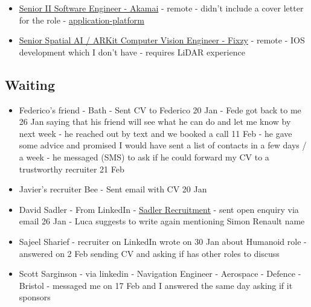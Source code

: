 \begin{itemize}
    \href{https://agratas.com/careers/jobs-opening/53240180-vision-systems-engineer}{Vision
    System Engineer - Agratas} - Bridgewater 
  \item
    \href{https://jobs.akamai.com/en/sites/CX_1/jobs/preview/2294/?keyword=Software&location=United+Kingdom&locationId=300000000469201&locationLevel=country&mode=location}
    {Senior II Software Engineer - Akamai} - remote - didn't include a cover
    letter for the role -
    \href{https://jobs.akamai.com/en/sites/CX_1/my-profile}{application-platform}
  \item
    \href{https://www.linkedin.com/jobs/view/4382672614/?trk=eml-email_job_alert_digest_01-primary_job_list-0-jobcard_body_0_jobid_4382672614_ssid_4516748569_fmid_7dmdxh~mmjaaycj~x1&refId=5P2H8GWRng6COtpG%2FhN8jg%3D%3D&trackingId=CZtFMTpH1AbDD8%2BrmnMW4g%3D%3D}{Senior
    Spatial AI / ARKit Computer Vision Engineer - Fixzy} - remote - IOS development which
    I don't have - requires LiDAR experience

\end{itemize}

\subsection*{Waiting}
\begin{itemize}
\item
    Federico's friend - Bath - Sent CV to Federico 20 Jan - Fede got back to
    me 26 Jan saying that his friend will see what he can do and let me know by
    next week - he reached out by text and we booked a call 11 Feb - he gave
    some advice and promised I would have sent a list of contacts in a few days
    / a week - he messaged (SMS) to ask if he could forward my CV to a
    trustworthy recruiter 21 Feb
\item
    Javier's recruiter Bee - Sent email with CV 20 Jan

\item
    David Sadler - From LinkedIn - \href{https://sadlerrecruitment.co.uk/}{Sadler Recruitment}
    - sent open enquiry via email 26 Jan - Luca suggests to write again
    mentioning Simon Renault name
\item
    Sajeel Sharief - recruiter on LinkedIn wrote on 30 Jan  about Humanoid role
    - answered on 2 Feb sending CV and asking if has other roles to discuss
\item Scott Sarginson - via linkedin - Navigation Engineer - Aerospace - Defence
  - Bristol - messaged me on 17 Feb and I answered the same day asking if it
    sponsors
\end{itemize}

